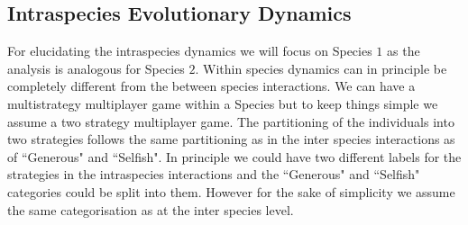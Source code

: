 \documentclass[12pt]{article}
\newcommand{\marcus}[1]{\textcolor{darkred}{(#1)}}
\begin{document}
\begin{appendices}
\section{Intraspecies Evolutionary Dynamics}
\label{appB}

For elucidating the intraspecies dynamics we will focus on Species $1$ as the analysis is analogous for Species $2$.
Within species dynamics can in principle be completely different from the between species interactions. 
We can have a multistrategy multiplayer game within a Species but to keep things simple we assume a two strategy multiplayer game.
The partitioning of the individuals into two strategies follows the same partitioning as in the inter species interactions as of ``Generous" and ``Selfish". 
In principle we could have two different labels for the strategies in the intraspecies interactions and the ``Generous" and ``Selfish" categories could be split into them.
However for the sake of simplicity we assume the same categorisation as at the inter species level.


\end{appendices}
\end{document}
